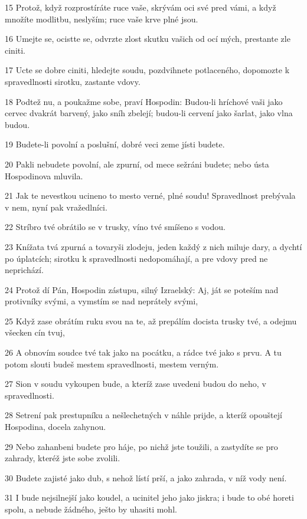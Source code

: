 \par 15 Protož, když rozprostíráte ruce vaše, skrývám oci své pred vámi, a když množíte modlitbu, neslyším; ruce vaše krve plné jsou.
\par 16 Umejte se, ocistte se, odvrzte zlost skutku vašich od ocí mých, prestante zle ciniti.
\par 17 Ucte se dobre ciniti, hledejte soudu, pozdvihnete potlaceného, dopomozte k spravedlnosti sirotku, zastante vdovy.
\par 18 Podtež nu, a poukažme sobe, praví Hospodin: Budou-li hríchové vaši jako cervec dvakrát barvený, jako sníh zbelejí; budou-li cervení jako šarlat, jako vlna budou.
\par 19 Budete-li povolní a poslušní, dobré veci zeme jísti budete.
\par 20 Pakli nebudete povolní, ale zpurní, od mece sežráni budete; nebo ústa Hospodinova mluvila.
\par 21 Jak te nevestkou ucineno to mesto verné, plné soudu! Spravedlnost prebývala v nem, nyní pak vražedlníci.
\par 22 Stríbro tvé obrátilo se v trusky, víno tvé smíšeno s vodou.
\par 23 Knížata tvá zpurná a tovaryši zlodeju, jeden každý z nich miluje dary, a dychtí po úplatcích; sirotku k spravedlnosti nedopomáhají, a pre vdovy pred ne neprichází.
\par 24 Protož dí Pán, Hospodin zástupu, silný Izraelský: Aj, ját se poteším nad protivníky svými, a vymstím se nad neprátely svými,
\par 25 Když zase obrátím ruku svou na te, až prepálím docista trusky tvé, a odejmu všecken cín tvuj,
\par 26 A obnovím soudce tvé tak jako na pocátku, a rádce tvé jako s prvu. A tu potom slouti budeš mestem spravedlnosti, mestem verným.
\par 27 Sion v soudu vykoupen bude, a kteríž zase uvedeni budou do neho, v spravedlnosti.
\par 28 Setrení pak prestupníku a nešlechetných v náhle prijde, a kteríž opouštejí Hospodina, docela zahynou.
\par 29 Nebo zahanbeni budete pro háje, po nichž jste toužili, a zastydíte se pro zahrady, kteréž jste sobe zvolili.
\par 30 Budete zajisté jako dub, s nehož lístí prší, a jako zahrada, v níž vody není.
\par 31 I bude nejsilnejší jako koudel, a ucinitel jeho jako jiskra; i bude to obé horeti spolu, a nebude žádného, ješto by uhasiti mohl.

